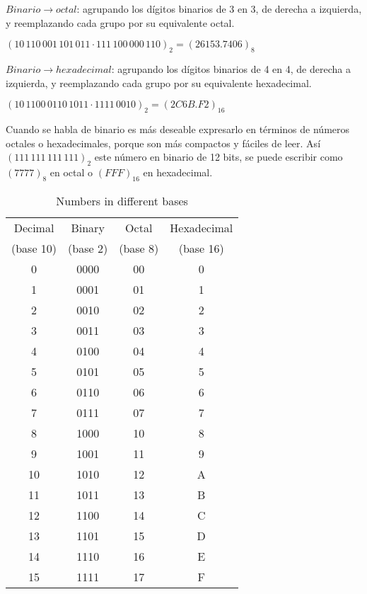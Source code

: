 \documentclass{article}
\begin{document}
$Binario \rightarrow octal$: agrupando los d\'{i}gitos binarios de 3 en 3,
de derecha a izquierda, y reemplazando cada grupo por su equivalente octal.
\begin{center}
    \large
    $(10\,110\,001\,101\,011 \cdot 111\,100\,000\,110)_2 = (26153.7406)_8$
\end{center}

$Binario \rightarrow hexadecimal$: agrupando los d\'{i}gitos binarios de 4 en 4,
de derecha a izquierda, y reemplazando cada grupo por su equivalente hexadecimal.
\begin{center}
    \large
    $(10\,1100\,0110\,1011 \cdot 1111\,0010)_2 = (2C6B.F2)_{16}$
\end{center}

Cuando se habla de binario es m\'{a}s deseable expresarlo en t\'{e}rminos de
n\'{u}meros octales o hexadecimales, porque son m\'{a}s compactos y f\'{a}ciles
de leer. As\'{i} $(111\,111\,111\,111)_2$ este n\'{u}mero en binario de 12 bits,
se puede escribir como $(7777)_8$ en octal o $(FFF)_{16}$ en hexadecimal.

\medskip

\begin{table}[h]
    \centering
    \begin{tabular}{cccc}
        \toprule
        Decimal & Binary & Octal & Hexadecimal \\
        (base 10) & (base 2) & (base 8) & (base 16) \\
        \midrule
        0 & 0000 & 00 & 0 \\
        1 & 0001 & 01 & 1 \\
        2 & 0010 & 02 & 2 \\
        3 & 0011 & 03 & 3 \\
        4 & 0100 & 04 & 4 \\
        5 & 0101 & 05 & 5 \\
        6 & 0110 & 06 & 6 \\
        7 & 0111 & 07 & 7 \\
        8 & 1000 & 10 & 8 \\
        9 & 1001 & 11 & 9 \\
        10 & 1010 & 12 & A \\
        11 & 1011 & 13 & B \\
        12 & 1100 & 14 & C \\
        13 & 1101 & 15 & D \\
        14 & 1110 & 16 & E \\
        15 & 1111 & 17 & F \\
        \bottomrule
    \end{tabular}
    \caption{Numbers in different bases}
    \label{tab:numbers}
\end{table}
\end{document}
